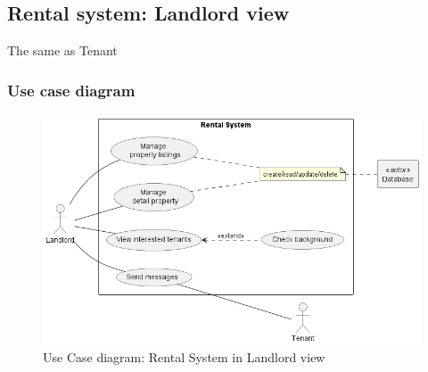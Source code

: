 \newpage
\subsection{Rental system: Landlord view}
The same as Tenant
\subsubsection{Use case diagram}
\begin{figure}[H]
    \centering
    \includegraphics[width = \textwidth]{Images/rental_systen_landlord.png}
    \caption{Use Case diagram: Rental System in Landlord view}
    \label{fig:enter-label}
\end{figure}

\newpage
